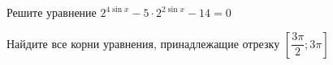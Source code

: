 \begin{ex}
	\begin{condition}
		\begin{enumcols}[label=\asbuk*)]
			\item Решите уравнение \( 2^{4\sin x } - 5\cdot2^{2\sin x} -14 = 0 \)
			\item Найдите все корни уравнения, принадлежащие отрезку \( \left[\dfrac{3\pi}{2};3\pi\right] \)
		\end{enumcols}
	\end{condition}
\end{ex}